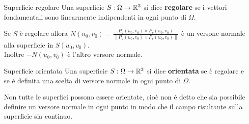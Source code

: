 \begin{definizione}{Superficie regolare}
  Una superficie $S:\Omega\to\mathbb{R}^3$ si dice \textbf{regolare} se i vettori fondamentali sono linearmente indipendenti in ogni punto di $\Omega$.
\end{definizione}

\begin{osservazione}{}
  Se $S$ è regolare allora $N(u_0,v_0) = \frac{P_u(u_0,v_0)\times P_v(u_0,v_0)}{\|P_u(u_0,v_0)\times P_v(u_0,v_0)\|}$ è un versone normale alla superficie in $S(u_0,v_0)$.\\
  Inoltre $-N(u_0,v_0)$ è l'altro versore normale.
\end{osservazione}

\begin{definizione}{Superficie orientata}
  Una superficie $S:\Omega\to\mathbb{R}^3$ si dice \textbf{orientata} se è regolare e se è definita una scelta di versore normale in ogni punto di $\Omega$.
\end{definizione}

\begin{osservazione}{}
  Non tutte le superfici possono essere orientate, cioè non è detto che sia possibile definire un versore normale in ogni punto in modo che il campo risultante sulla superficie sia continuo.
\end{osservazione}

